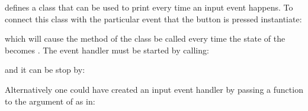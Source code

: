 \documentclass[letterpaper,10pt,english]{sphinxmanual}
\begin{document}
defines a class that can be used to print  every
time an input event happens. To connect this class with the particular
event that the  button is pressed instantiate:

\begin{sphinxVerbatim}[commandchars=\\\{\}]
   
\end{sphinxVerbatim}

which will cause the method  of the  class be
called every time the state of the  becomes
{\hyperref[\detokenize{index:rcpy.gpio.LOW}]{}}. The event handler must be started by
calling:

\begin{sphinxVerbatim}[commandchars=\\\{\}]
\end{sphinxVerbatim}

and it can be stop by:

\begin{sphinxVerbatim}[commandchars=\\\{\}]
\end{sphinxVerbatim}

Alternatively one could have created an input event handler by passing
a function to the argument  of
{\hyperref[\detokenize{index:rcpy.gpio.InputEvent}]{}} as in:

\begin{sphinxVerbatim}[commandchars=\\\{\}]
  
       
       

  
                                
                                
\end{sphinxVerbatim}
\end{document}
